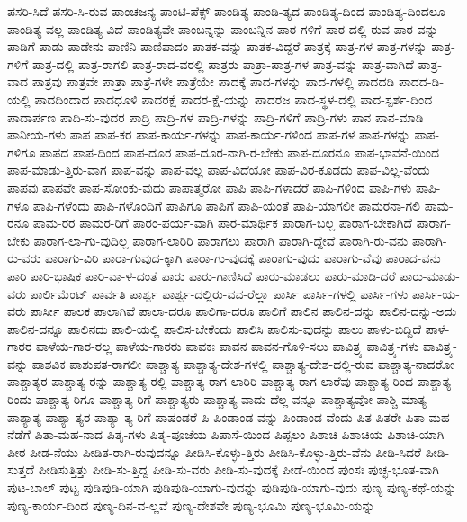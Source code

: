 {ಪಸರಿ-ಸಿದೆ
ಪಸರಿ-ಸಿ-ರುವ
ಪಾಂಚಜನ್ಯ
ಪಾಂಟಿ-ಪೆಕ್ಸ್
ಪಾಂಡಿತ್ಯ
ಪಾಂಡಿ-ತ್ಯದ
ಪಾಂಡಿತ್ಯ-ದಿಂದ
ಪಾಂಡಿತ್ಯ-ದಿಂದಲೂ
ಪಾಂಡಿತ್ಯ-ವಲ್ಲ
ಪಾಂಡಿತ್ಯ-ವಿದೆ
ಪಾಂಡಿತ್ಯವೇ
ಪಾಂಬನ್ನನ್ನು
ಪಾಂಬನ್ನಿನ
ಪಾಠ-ಗಳಿಗೆ
ಪಾಠ-ದಲ್ಲಿ-ರುವ
ಪಾಠ-ವನ್ನು
ಪಾಡಿಗೆ
ಪಾಡು
ಪಾಡೇನು
ಪಾಣಿನಿ
ಪಾಣಿಪಾದಂ
ಪಾತಕ-ವನ್ನು
ಪಾತಕ-ವಿದ್ದರೆ
ಪಾತ್ರಕ್ಕೆ
ಪಾತ್ರ-ಗಳ
ಪಾತ್ರ-ಗಳನ್ನು
ಪಾತ್ರ-ಗಳಿಗೆ
ಪಾತ್ರ-ದಲ್ಲಿ
ಪಾತ್ರ-ರಾಗಲಿ
ಪಾತ್ರ-ರಾದ-ವರಲ್ಲಿ
ಪಾತ್ರರು
ಪಾತ್ರಾ-ಪಾತ್ರ-ಗಳ
ಪಾತ್ರ-ವನ್ನು
ಪಾತ್ರ-ವಾಗಿದೆ
ಪಾತ್ರ-ವಾದ
ಪಾತ್ರವು
ಪಾತ್ರವೇ
ಪಾತ್ರಾ
ಪಾತ್ರೆ-ಗಳೇ
ಪಾತ್ರೆಯೇ
ಪಾದಕ್ಕೆ
ಪಾದ-ಗಳನ್ನು
ಪಾದ-ಗಳಲ್ಲಿ
ಪಾದದಡಿ
ಪಾದದ-ಡಿ-ಯಲ್ಲಿ
ಪಾದದಿಂದಾದ
ಪಾದಧೂಳಿ
ಪಾದರಕ್ಷೆ
ಪಾದರ-ಕ್ಷೆ-ಯನ್ನು
ಪಾದರಜ
ಪಾದ-ಸ್ಥಳ-ದಲ್ಲಿ
ಪಾದ-ಸ್ಪರ್ಶ-ದಿಂದ
ಪಾದಾರ್ಪಣ
ಪಾದಿ-ಸು-ವುದರ
ಪಾದ್ರಿ
ಪಾದ್ರಿ-ಗಳ
ಪಾದ್ರಿ-ಗಳನ್ನು
ಪಾದ್ರಿ-ಗಳಿಗೆ
ಪಾದ್ರಿ-ಗಳು
ಪಾನ
ಪಾನ-ಮಾಡಿ
ಪಾನೀಯ-ಗಳು
ಪಾಪ
ಪಾಪ-ಕರ
ಪಾಪ-ಕಾರ್ಯ-ಗಳನ್ನು
ಪಾಪ-ಕಾರ್ಯ-ಗಳಿಂದ
ಪಾಪ-ಗಳ
ಪಾಪ-ಗಳನ್ನು
ಪಾಪ-ಗಳಿಗೂ
ಪಾಪದ
ಪಾಪ-ದಿಂದ
ಪಾಪ-ದೂರ
ಪಾಪ-ದೂರ-ನಾಗಿ-ರ-ಬೇಕು
ಪಾಪ-ದೂರನೂ
ಪಾಪ-ಭಾವನೆ-ಯಿಂದ
ಪಾಪ-ಮಾಡು-ತ್ತಿರು-ವಾಗ
ಪಾಪ-ವನ್ನು
ಪಾಪ-ವಲ್ಲ
ಪಾಪ-ವಿದೆಯೋ
ಪಾಪ-ವಿರ-ಕೂಡದು
ಪಾಪ-ವಿಲ್ಲ-ವೆಂದು
ಪಾಪವು
ಪಾಪವೇ
ಪಾಪ-ಸೋಂಕು-ವುದು
ಪಾಪಾತ್ಮರೋ
ಪಾಪಿ
ಪಾಪಿ-ಗಳಾದರೆ
ಪಾಪಿ-ಗಳಿಂದ
ಪಾಪಿ-ಗಳು
ಪಾಪಿ-ಗಳೂ
ಪಾಪಿ-ಗಳೆಂದು
ಪಾಪಿ-ಗಳೊಂದಿಗೆ
ಪಾಪಿಗೂ
ಪಾಪಿಗೆ
ಪಾಪಿ-ಯಂತೆ
ಪಾಪಿ-ಯಾಗಲೀ
ಪಾಮರನಾ-ಗಲಿ
ಪಾಮ-ರನೂ
ಪಾಮ-ರರ
ಪಾಮರ-ರಿಗೆ
ಪಾರಂ-ಪರ್ಯ-ವಾಗಿ
ಪಾರ-ಮಾರ್ಥಿಕ
ಪಾರಾಗ-ಬಲ್ಲ
ಪಾರಾಗ-ಬೇಕಾಗಿದೆ
ಪಾರಾಗ-ಬೇಕು
ಪಾರಾಗ-ಲಾ-ಗು-ವುದಿಲ್ಲ
ಪಾರಾಗ-ಲಾರಿರಿ
ಪಾರಾಗಲು
ಪಾರಾಗಿ
ಪಾರಾಗಿ-ದ್ದೇವೆ
ಪಾರಾಗಿ-ರು-ವನು
ಪಾರಾಗಿ-ರು-ವರು
ಪಾರಾಗು-ವಿರಿ
ಪಾರಾ-ಗುವುದ-ಕ್ಕಾಗಿ
ಪಾರಾ-ಗು-ವುದಕ್ಕೆ
ಪಾರಾಗು-ವುದು
ಪಾರಾಗು-ವೆವು
ಪಾರಾದ-ವನು
ಪಾರಿ
ಪಾರಿ-ಭಾಷಿಕ
ಪಾರಿ-ವಾ-ಳ-ದಂತೆ
ಪಾರು
ಪಾರು-ಗಾಣಿಸಿದೆ
ಪಾರು-ಮಾಡಲು
ಪಾರು-ಮಾಡಿ-ದರೆ
ಪಾರು-ಮಾಡು-ವರು
ಪಾರ್ಲಿಮೆಂಟ್
ಪಾರ್ವತಿ
ಪಾರ್ಶ್ವ
ಪಾರ್ಶ್ವ-ದಲ್ಲಿರು-ವವ-ರೆಲ್ಲಾ
ಪಾರ್ಸಿ
ಪಾರ್ಸಿ-ಗಳಲ್ಲಿ
ಪಾರ್ಸಿ-ಗಳು
ಪಾರ್ಸಿ-ಯ-ವರು
ಪಾರ್ಸೀ
ಪಾಲಕ
ಪಾಲಾಗಿವೆ
ಪಾಲಾ-ದರೂ
ಪಾಲಿಗಾ-ದರೂ
ಪಾಲಿಗೆ
ಪಾಲಿನ
ಪಾಲಿನ-ದನ್ನು
ಪಾಲಿನ-ದನ್ನು-ಅದು
ಪಾಲಿನ-ದನ್ನೂ
ಪಾಲಿನದು
ಪಾಲಿ-ಯಲ್ಲಿ
ಪಾಲಿಸ-ಬೇಕೆಂದು
ಪಾಲಿಸಿ
ಪಾಲಿಸು-ವುದನ್ನು
ಪಾಲು
ಪಾಳು-ಬಿದ್ದಿದೆ
ಪಾಳೆ-ಗಾರರ
ಪಾಳೆಯ-ಗಾರ-ರಲ್ಲ
ಪಾಳೆಯ-ಗಾರರು
ಪಾವಕಃ
ಪಾವನ
ಪಾವನ-ಗೊಳಿ-ಸಲು
ಪಾವಿತ್ರ್ಯ
ಪಾವಿತ್ರ್ಯ-ಗಳು
ಪಾವಿತ್ರ್ಯ-ವನ್ನು
ಪಾಶವಿಕ
ಪಾಶುಪತ-ರಾಗಲೀ
ಪಾಶ್ಚಾತ್ಯ
ಪಾಶ್ಚಾತ್ಯ-ದೇಶ-ಗಳಲ್ಲಿ
ಪಾಶ್ಚಾತ್ಯ-ದೇಶ-ದಲ್ಲಿ-ರುವ
ಪಾಶ್ಚಾತ್ಯ-ನಾದರೋ
ಪಾಶ್ಚಾತ್ಯರ
ಪಾಶ್ಚಾತ್ಯ-ರನ್ನು
ಪಾಶ್ಚಾತ್ಯ-ರಲ್ಲಿ
ಪಾಶ್ಚಾತ್ಯ-ರಾಗ-ಲಾರಿರಿ
ಪಾಶ್ಚಾತ್ಯ-ರಾಗ-ಲಾರೆವು
ಪಾಶ್ಚಾತ್ಯ-ರಿಂದ
ಪಾಶ್ಚಾತ್ಯ-ರಿಂದು
ಪಾಶ್ಚಾತ್ಯ-ರಿಗೂ
ಪಾಶ್ಚಾತ್ಯ-ರಿಗೆ
ಪಾಶ್ಚಾತ್ಯರು
ಪಾಶ್ಚಾತ್ಯ-ವಾದು-ದೆಲ್ಲ-ವನ್ನೂ
ಪಾಶ್ಚಾತ್ಯವೋ
ಪಾಶ್ಚಿ-ಮಾತ್ಯ
ಪಾಶ್ಯಾತ್ಯ
ಪಾಶ್ಯಾ-ತ್ಯರ
ಪಾಶ್ಯಾ-ತ್ಯ-ರಿಗೆ
ಪಾಷಂಡರೆ
ಪಿ
ಪಿಂಡಾಂಡ-ವನ್ನು
ಪಿಂಡಾಂಡ-ವೆಂದು
ಪಿತ
ಪಿತರೇ
ಪಿತಾ-ಮಹ-ನೆಡೆಗೆ
ಪಿತಾ-ಮಹ-ನಾದ
ಪಿತೃ-ಗಳು
ಪಿತೃ-ಪೂಜೆಯ
ಪಿಪಾಸೆ-ಯಿಂದ
ಪಿಪ್ಪಲಂ
ಪಿಶಾಚಿ
ಪಿಶಾಚಿಯ
ಪಿಶಾಚಿ-ಯಾಗಿ
ಪೀಠ
ಪೀಡ-ನೆಯು
ಪೀಡಿತ-ರಾಗಿ-ರುವುದನ್ನೂ
ಪೀಡಿಸಿ-ಕೊಳ್ಳು-ತ್ತಿರು
ಪೀಡಿಸಿ-ಕೊಳ್ಳು-ತ್ತಿರು-ವೆನು
ಪೀಡಿ-ಸಿದರೆ
ಪೀಡಿ-ಸುತ್ತದೆ
ಪೀಡಿಸುತ್ತಿತ್ತು
ಪೀಡಿ-ಸು-ತ್ತಿದ್ದ
ಪೀಡಿ-ಸು-ವರು
ಪೀಡಿ-ಸು-ವುದಕ್ಕೆ
ಪೀಡೆ-ಯಿಂದ
ಪುಂಸಃ
ಪುಚ್ಛ-ಭೂತ-ವಾಗಿ
ಪುಟ-ಬಾಲ್
ಪುಟ್ಟ
ಪುಡಿಪುಡಿ-ಯಾಗಿ
ಪುಡಿಪುಡಿ-ಯಾಗು-ವುದನ್ನು
ಪುಡಿಪುಡಿ-ಯಾಗು-ವುದು
ಪುಣ್ಯ
ಪುಣ್ಯ-ಕಥೆ-ಯನ್ನು
ಪುಣ್ಯ-ಕಾರ್ಯ-ದಿಂದ
ಪುಣ್ಯ-ದಿನ-ವ-ಲ್ಲವೆ
ಪುಣ್ಯ-ದೇಶವೇ
ಪುಣ್ಯ-ಭೂಮಿ
ಪುಣ್ಯ-ಭೂಮಿ-ಯನ್ನು
}

